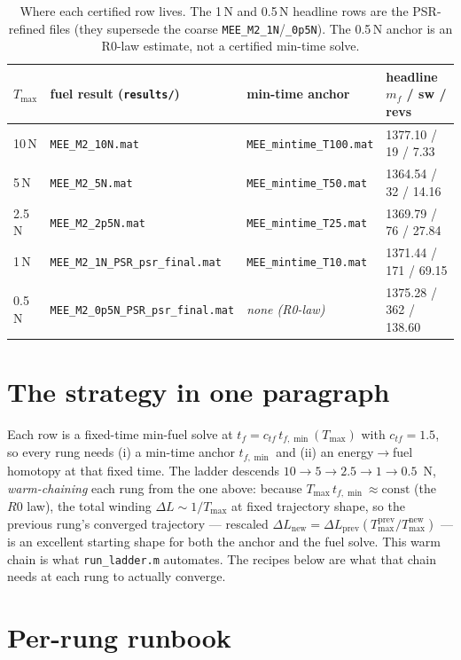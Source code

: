 \documentclass[11pt]{article}
\newcommand{\file}[1]{\texttt{\small #1}}
\newcommand{\dL}{\Delta L}
\newcommand{\Tmax}{T_{\max}}
\begin{document}
\begin{table}[h]\centering\small
\begin{tabular}{@{}llll@{}}
\toprule
$\Tmax$ & fuel result (\file{results/}) & min-time anchor & headline $m_f$ / sw / revs \\
\midrule
10\,N   & \file{MEE\_M2\_10N.mat}                 & \file{MEE\_mintime\_T100.mat} & 1377.10 / 19 / 7.33 \\
5\,N    & \file{MEE\_M2\_5N.mat}                  & \file{MEE\_mintime\_T50.mat}  & 1364.54 / 32 / 14.16 \\
2.5\,N  & \file{MEE\_M2\_2p5N.mat}                & \file{MEE\_mintime\_T25.mat}  & 1369.79 / 76 / 27.84 \\
1\,N    & \file{MEE\_M2\_1N\_PSR\_psr\_final.mat} & \file{MEE\_mintime\_T10.mat}  & 1371.44 / 171 / 69.15 \\
0.5\,N  & \file{MEE\_M2\_0p5N\_PSR\_psr\_final.mat} & \emph{none (R0-law)}       & 1375.28 / 362 / 138.60 \\
\bottomrule
\end{tabular}
\caption{Where each certified row lives. The 1\,N and 0.5\,N headline rows are
the PSR-refined files (they supersede the coarse \file{MEE\_M2\_1N}/\file{\_0p5N}).
The 0.5\,N anchor is an R0-law estimate, not a certified min-time solve.}
\label{tab:provenance}
\end{table}

\section{The strategy in one paragraph}

Each row is a fixed-time min-fuel solve at $t_f=c_{tf}\,t_{f,\min}(\Tmax)$ with
$c_{tf}=1.5$, so every rung needs (i) a min-time anchor $t_{f,\min}$ and (ii) an
energy$\to$fuel homotopy at that fixed time. The ladder descends
$10\to5\to2.5\to1\to0.5$~N, \emph{warm-chaining} each rung from the one above:
because $\Tmax\,t_{f,\min}\approx\text{const}$ (the $R0$ law), the total winding
$\dL\sim1/\Tmax$ at fixed trajectory shape, so the previous rung's converged
trajectory --- rescaled $\dL_{\text{new}}=\dL_{\text{prev}}(\Tmax^{\text{prev}}/
\Tmax^{\text{new}})$ --- is an excellent starting shape for both the anchor and
the fuel solve. This warm chain is what \file{run\_ladder.m} automates. The
recipes below are what that chain needs at each rung to actually converge.

\section{Per-rung runbook}
\label{sec:rungs}
\end{document}
